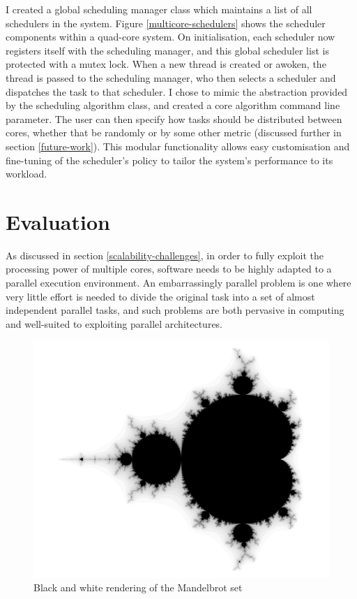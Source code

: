 \documentclass[bsc,frontabs,singlespacing,parskip,deptreport]{infthesis}
\begin{document}
I created a global scheduling manager class which maintains a list of all schedulers in the system. Figure \ref{multicore-schedulers} shows the scheduler components within a quad-core system. On initialisation, each scheduler now registers itself with the scheduling manager, and this global scheduler list is protected with a mutex lock. When a new thread is created or awoken, the thread is passed to the scheduling manager, who then selects a scheduler and dispatches the task to that scheduler. I chose to mimic the abstraction provided by the scheduling algorithm class, and created a core algorithm command line parameter. The user can then specify how tasks should be distributed between cores, whether that be randomly or by some other metric (discussed further in section \ref{future-work}). This modular functionality allows easy customisation and fine-tuning of the scheduler's policy to tailor the system's performance to its workload.


\chapter{Evaluation}
As discussed in section \ref{scalability-challenges}, in order to fully exploit the processing power of multiple cores, software needs to be highly adapted to a parallel execution environment. An embarrassingly parallel problem is one where very little effort is needed to divide the original task into a set of almost independent parallel tasks, and such problems are both pervasive in computing and well-suited to exploiting parallel architectures. 

\begin{figure}[h]
    \centering
    \includegraphics[scale=0.17]{mandelbrot-bw.jpg}
    \caption{Black and white rendering of the Mandelbrot set \cite{mandelbrot-bw}}
    \label{mandelbrot-bw}
\end{figure}
\end{document}
